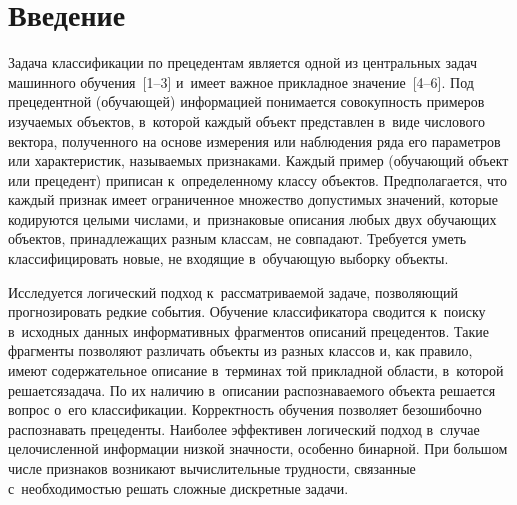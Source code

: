 
  
\vspace*{-2pt}



\thispagestyle{headings}

\begin{multicols}{2}

\label{st\stat}


\section{Введение}

\vspace*{-3pt}

  Задача классификации по прецедентам является одной из центральных задач 
машинного обуче\-ния~[1--3] и~имеет важ\-ное прикладное значение~[4--6]. Под 
прецедентной (обуча\-ющей) \mbox{информацией} понимается совокупность примеров 
изуча\-емых объектов, в~которой каждый объект представлен в~виде числового 
вектора, полученного на основе измерения или наблюдения ряда его 
па\-ра\-мет\-ров или характеристик, называемых признаками. Каждый пример 
(обучающий объект или прецедент) приписан к~определенному классу 
объектов. Предполагается, что каждый признак имеет ограниченное множество 
допустимых значений, которые кодируются целыми числами, и~признаковые 
описания любых двух обучающих объектов, принадлежащих разным классам, 
не совпадают. Требуется уметь классифицировать новые, не входящие в~обуча\-ющую выборку объекты. 
  
  Исследуется логический подход к~рассматриваемой задаче, позволяющий 
прогнозировать редкие события. Обучение классификатора сводится к~поиску в~исходных данных информативных фрагментов описаний прецедентов. Такие 
фрагменты позволяют различать объекты из разных классов и, как правило, 
имеют содержательное описание в~терминах той прикладной об\-ласти, 
в~которой решается\linebreak задача. По их наличию в~описании рас\-по\-зна\-ва\-емо\-го 
объекта решается вопрос о~его классификации. Кор\-рект\-ность обуче\-ния 
поз\-во\-ля\-ет без\-оши\-боч\-но распознавать прецеденты. Наиболее \mbox{эффективен} 
логический подход в~случае це\-ло\-чис\-лен\-ной информации низкой знач\-ности, 
особенно бинарной. При большом чис\-ле признаков возникают 
вы\-чис\-ли\-тель\-ные трудности, связанные с~не\-об\-хо\-ди\-мостью решать сложные 
дискретные задачи.
  

\end{multicols}

